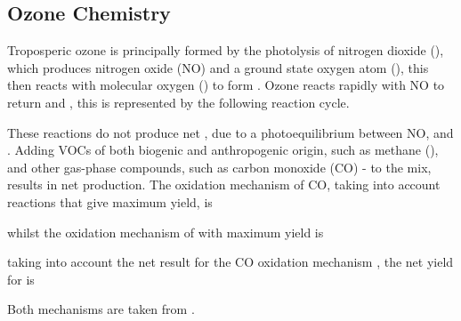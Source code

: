 \subsection{Ozone Chemistry}
Troposperic ozone is principally formed by the photolysis of nitrogen dioxide (), which produces nitrogen oxide (NO) and a ground state oxygen atom (), this then reacts with molecular oxygen () to form . 
Ozone reacts rapidly with NO to return  and , this is represented by the following reaction cycle.
\begin{reactionlist}
\end{reactionlist}
These reactions do not produce net , due to a photoequilibrium between NO,  and  \citep{Atkinson:2000}. 
Adding VOCs of both biogenic and anthropogenic origin, such as methane (), and other gas-phase compounds, such as carbon monoxide (CO) - to the mix, results in net  production. 
The oxidation mechanism of CO, taking into account reactions that give maximum  yield, is
\begin{reactionlist}
    \hline
\end{reactionlist}
whilst the oxidation mechanism of  with maximum  yield is
\begin{reactionlist}
    \hline
\end{reactionlist}
taking into account the net result for the CO oxidation mechanism , the net yield for  is
\begin{reactionlist}
\end{reactionlist}
Both mechanisms are taken from \citep{Seinfeld:2006}.

